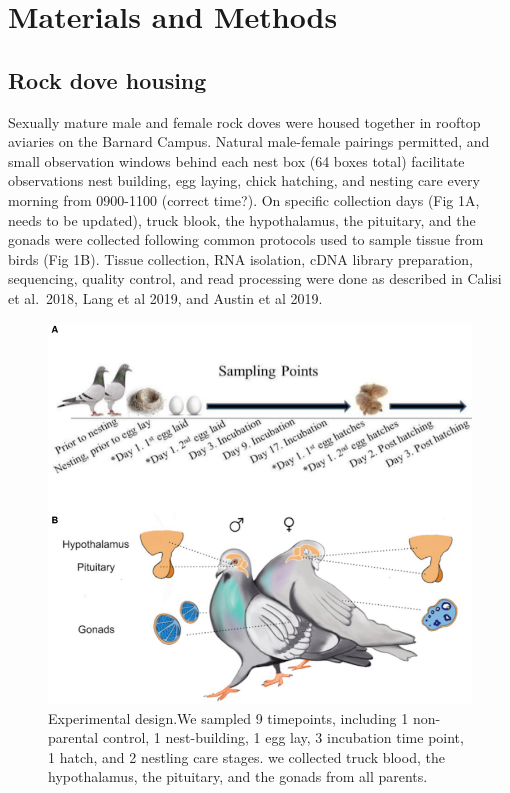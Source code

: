 \documentclass[10pt,letterpaper]{article}
\begin{document}
\hypertarget{materials-and-methods}{%
\section{Materials and Methods}\label{materials-and-methods}}

\hypertarget{rock-dove-housing}{%
\subsection{Rock dove housing}\label{rock-dove-housing}}

Sexually mature male and female rock doves were housed together in
rooftop aviaries on the Barnard Campus. Natural male-female pairings
permitted, and small observation windows behind each nest box (64 boxes
total) facilitate observations nest building, egg laying, chick
hatching, and nesting care every morning from 0900-1100 (correct time?).
On specific collection days (Fig 1A, needs to be updated), truck blook,
the hypothalamus, the pituitary, and the gonads were collected following
common protocols used to sample tissue from birds (Fig 1B). Tissue
collection, RNA isolation, cDNA library preparation, sequencing, quality
control, and read processing were done as described in Calisi et
al.~2018, Lang et al 2019, and Austin et al 2019.

\begin{figure}
\centering
\includegraphics{characterization_manuscript_files/figure-latex/unnamed-chunk-2-1.pdf}
\caption{Experimental design.We sampled 9 timepoints, including 1
non-parental control, 1 nest-building, 1 egg lay, 3 incubation time
point, 1 hatch, and 2 nestling care stages. we collected truck blood,
the hypothalamus, the pituitary, and the gonads from all parents.}
\end{figure}
\end{document}
